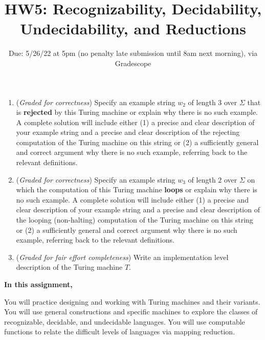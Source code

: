 \documentclass[12pt, oneside]{article}
\begin{document}
\begin{enumerate}
\begin{enumerate}
        {\it Hint:} In class we've drawn pictures to represent the configuration of the machine at each step 
        in a computation.  You may do so or you may choose to describe these configurations in words.
        
        \item ({\it Graded for correctness}) Specify an example string $w_2$ of length $3$ over $\Sigma$ 
        that is {\bf rejected} by this Turing machine
        or explain why there is no such 
        example. A complete solution will include either (1) a precise and clear 
        description of your example  string and a precise and clear description of the rejecting computation
        of the Turing machine on this string or (2) a sufficiently
        general and correct argument why there is no such example, referring back to the relevant definitions.

        \item ({\it Graded for correctness}) Specify an example string $w_3$ of length $2$ over $\Sigma$ 
        on which  the computation of this Turing machine {\bf loops}
        or explain why there is no such 
        example. A complete solution will include either (1) a precise and clear 
        description of your example  string and a precise and clear description of the looping (non-halting) 
        computation
        of the Turing machine on this string or (2) a sufficiently
        general and correct argument why there is no such example, referring back to the relevant definitions.

        \item ({\it Graded for fair effort completeness}) Write an implementation level description of 
        the Turing machine $T$.
\end{enumerate}

\end{enumerate}
\newpage

\title{HW5: Recognizability, Decidability, Undecidability, and Reductions}
\date{Due: 5/26/22 at 5pm (no penalty late submission until 8am next morning), via Gradescope}


\maketitle
\thispagestyle{fancy}

{\bf In this assignment,}

You will practice designing and working with Turing machines and their variants. 
You will use general constructions and specific machines to explore the classes of recognizable, 
decidable, and undecidable languages.
You will use computable functions to relate the difficult levels of languages via mapping reduction.
\end{document}
